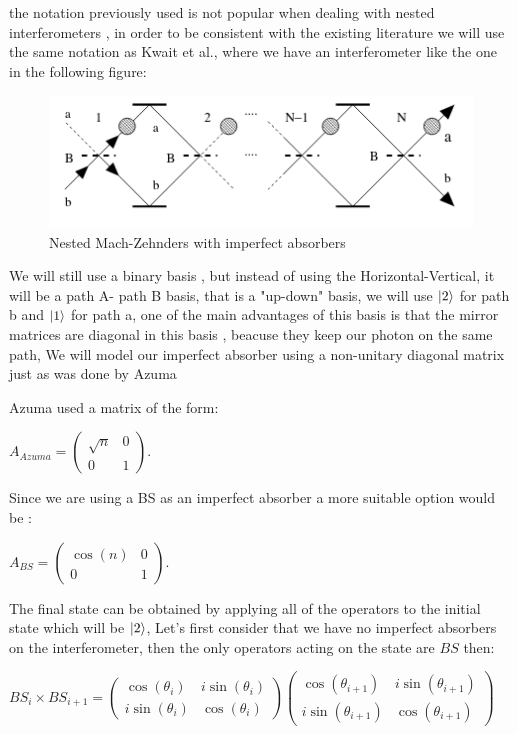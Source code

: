 \documentclass[11pt]{article}
\begin{document}
 the notation previously used is not popular when dealing with nested interferometers , in order to be consistent with the existing literature we will use the same notation as Kwait et al.\cite{5}, where we have an interferometer  like the one in the following figure:
 
\begin{figure}[h!]
\centering
\includegraphics[width=\linewidth]{baseAzuma.png}
\caption{Nested Mach-Zehnders  with imperfect absorbers}
\label{fig:BS2}
\end{figure}
 
 We will still use a binary basis , but instead of using the Horizontal-Vertical, it will be a path A- path B basis, that is a "up-down" basis, we will use $\ket{2}$ for path b and $\ket{1}$ for path a, one of the main advantages of this basis is that the mirror matrices are diagonal in this basis , beacuse they keep our photon on the same path, We will model our imperfect absorber using a non-unitary diagonal matrix just as was done by  Azuma \cite{9}  
 
 Azuma used a matrix of the form:
 
  $A_{Azuma}=\begin{pmatrix} \sqrt{n} & 0\\0& 1\end{pmatrix}$.

Since we are using a BS as an imperfect absorber a more suitable option would be :

 $A_{BS}=\begin{pmatrix} \cos(n) & 0\\0& 1\end{pmatrix}$.


The final state can be obtained by applying all of the operators to the initial state which will be $\ket{2}$, Let's first consider that we have no imperfect absorbers on the interferometer, then the only operators acting on the state are $BS$ then:

$BS_{i} \times BS_{i+1}=\begin{pmatrix} \cos(\theta_{i}) & i \sin(\theta_{i}) \\ i \sin(\theta_{i}) & \cos(\theta_{i}) \end{pmatrix}  
\begin{pmatrix} \cos(\theta_{i+1}) & i \sin(\theta_{i+1}) \\ i \sin(\theta_{i+1}) & \cos(\theta_{i+1}) \end{pmatrix}$
\end{document}

